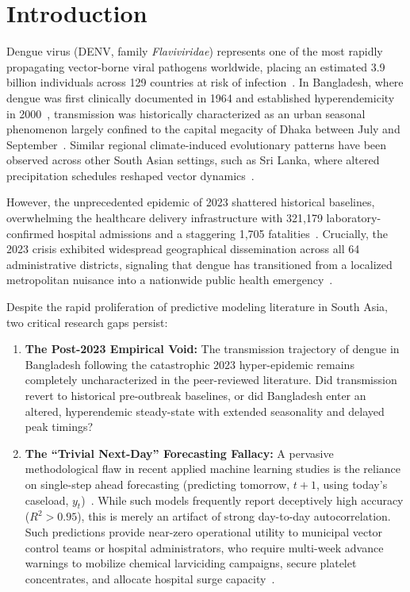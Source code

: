 \documentclass[11pt,a4paper]{article}
\begin{document}
\newpage
\section{Introduction}

Dengue virus (DENV, family \textit{Flaviviridae}) represents one of the most rapidly propagating vector-borne viral pathogens worldwide, placing an estimated 3.9 billion individuals across 129 countries at risk of infection~\cite{messina2019current,who2024dengue}. In Bangladesh, where dengue was first clinically documented in 1964 and established hyperendemicity in 2000~\cite{dghs2026dashboard,rahman2024changing}, transmission was historically characterized as an urban seasonal phenomenon largely confined to the capital megacity of Dhaka between July and September~\cite{rahman2024changing,sharmin2015emergence}. Similar regional climate-induced evolutionary patterns have been observed across other South Asian settings, such as Sri Lanka, where altered precipitation schedules reshaped vector dynamics~\cite{sirisena2014evolution}.

However, the unprecedented epidemic of 2023 shattered historical baselines, overwhelming the healthcare delivery infrastructure with 321,179 laboratory-confirmed hospital admissions and a staggering 1,705 fatalities~\cite{dghs2026dashboard,hossain2024catastrophic}. Crucially, the 2023 crisis exhibited widespread geographical dissemination across all 64 administrative districts, signaling that dengue has transitioned from a localized metropolitan nuisance into a nationwide public health emergency~\cite{rahman2024changing,hossain2024catastrophic}.

Despite the rapid proliferation of predictive modeling literature in South Asia, two critical research gaps persist:
\begin{enumerate}
    \item \textbf{The Post-2023 Empirical Void:} The transmission trajectory of dengue in Bangladesh following the catastrophic 2023 hyper-epidemic remains completely uncharacterized in the peer-reviewed literature. Did transmission revert to historical pre-outbreak baselines, or did Bangladesh enter an altered, hyperendemic steady-state with extended seasonality and delayed peak timings?
    \item \textbf{The ``Trivial Next-Day'' Forecasting Fallacy:} A pervasive methodological flaw in recent applied machine learning studies is the reliance on single-step ahead forecasting (predicting tomorrow, $t+1$, using today's caseload, $y_t$)~\cite{johansson2019open,runge2016does}. While such models frequently report deceptively high accuracy ($R^2 > 0.95$), this is merely an artifact of strong day-to-day autocorrelation. Such predictions provide near-zero operational utility to municipal vector control teams or hospital administrators, who require multi-week advance warnings to mobilize chemical larviciding campaigns, secure platelet concentrates, and allocate hospital surge capacity~\cite{johansson2019open,runge2016does}.
\end{enumerate}
\end{document}
